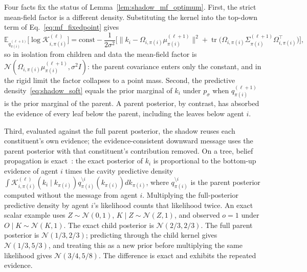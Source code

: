 \begin{remark}
\label{rem:shadow_marginal_vs_mf}
Four facts fix the status of Lemma~\ref{lem:shadow_mf_optimum}. First, the strict mean-field factor is a different density. Substituting the kernel into the top-down term of Eq.~\eqref{eq:mf_fixedpoint} gives
\[
\mathbb{E}_{q_{\pi(i)}^{(\ell+1)}}\big[\log \mathcal{K}_{i,\pi(i)}^{(\ell)}\big] = \text{const} - \frac{1}{2\sigma^2}\Big[\big\|k_i - \Omega_{i,\pi(i)}\mu_{\pi(i)}^{(\ell+1)}\big\|^2 + \operatorname{tr}\big(\Omega_{i,\pi(i)}\Sigma_{\pi(i)}^{(\ell+1)}\Omega_{i,\pi(i)}^\top\big)\Big],
\]
so in isolation from children and data the mean-field factor is $\mathcal{N}(\Omega_{i,\pi(i)}\mu_{\pi(i)}^{(\ell+1)}, \sigma^2 I)$: the parent covariance enters only the constant, and in the rigid limit the factor collapses to a point mass. Second, the predictive density~\eqref{eq:shadow_soft} equals the prior marginal of $k_i$ under $p_\sigma$ when $q_{\pi(i)}^{(\ell+1)}$ is the prior marginal of the parent. A parent posterior, by contrast, has absorbed the evidence of every leaf below the parent, including the leaves below agent $i$.

Third, evaluated against the full parent posterior, the shadow reuses each constituent's own evidence; the evidence-consistent downward message uses the parent posterior with that constituent's contribution removed. On a tree, belief propagation is exact~\cite[\S8.4]{Bishop2006}: the exact posterior of $k_i$ is proportional to the bottom-up evidence of agent $i$ times the cavity predictive density $\int \mathcal{K}_{i,\pi(i)}^{(\ell)}(k_i \mid k_{\pi(i)}) q_{\pi(i)}^{\setminus i}(k_{\pi(i)}) dk_{\pi(i)}$, where $q_{\pi(i)}^{\setminus i}$ is the parent posterior computed without the message from agent $i$. Multiplying the full-posterior predictive density by agent $i$'s likelihood counts that likelihood twice. An exact scalar example uses $Z\sim\mathcal N(0,1)$, $K\mid Z\sim\mathcal N(Z,1)$, and observed $o=1$ under $O\mid K\sim\mathcal N(K,1)$. The exact child posterior is $\mathcal N(2/3,2/3)$. The full parent posterior is $\mathcal N(1/3,2/3)$; predicting through the child kernel gives $\mathcal N(1/3,5/3)$, and treating this as a new prior before multiplying the same likelihood gives $\mathcal N(3/4,5/8)$. The difference is exact and exhibits the repeated evidence.


\end{remark}
